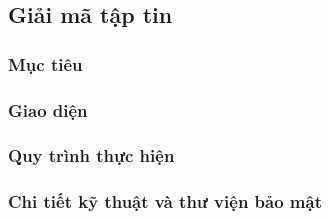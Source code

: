 \newpage
\subsection{Giải mã tập tin}
\subsubsection*{Mục tiêu}

\subsubsection*{Giao diện}

\subsubsection*{Quy trình thực hiện}

\subsubsection*{Chi tiết kỹ thuật và thư viện bảo mật}